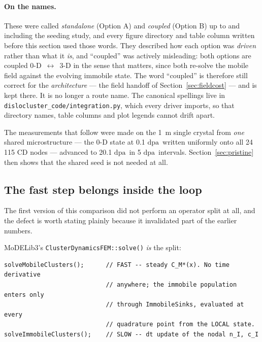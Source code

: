 \documentclass[11pt,a4paper]{article}
\newcommand{\code}[1]{\texttt{\small #1}}
\newcommand{\dpa}{\ensuremath{\mathrm{dpa}}}
\begin{document}
\paragraph{On the names.} These were called \emph{standalone} (Option A) and
\emph{coupled} (Option B) up to and including the seeding study, and every
figure directory and table column written before this section used those words.
They described how each option was \emph{driven} rather than what it \emph{is},
and ``coupled'' was actively misleading: both options are coupled
0-D~$\leftrightarrow$~3-D in the sense that matters, since both re-solve the
mobile field against the evolving immobile state. The word ``coupled'' is
therefore still correct for the \emph{architecture} --- the field handoff of
Section~\ref{sec:fieldcost} --- and is kept there. It is no longer a route name.
The canonical spellings live in \code{dislocluster\_code/integration.py}, which
every driver imports, so that directory names, table columns and plot legends
cannot drift apart.

The measurements that follow were made on the 1~\textmu m single crystal from
\emph{one} shared microstructure --- the 0-D state at 0.1 \dpa\ written
uniformly onto all 24\,115 CD nodes --- advanced to 20.1 \dpa\ in 5 \dpa\
intervals. Section~\ref{sec:pristine} then shows that the shared seed is not
needed at all.

\subsection{The fast step belongs inside the loop}
\label{sec:fastinloop}

The first version of this comparison did not perform an operator split at all,
and the defect is worth stating plainly because it invalidated part of the
earlier numbers.

MoDELib3's \code{ClusterDynamicsFEM::solve()} \emph{is} the split:

\begin{center}
\begin{minipage}{0.88\textwidth}
\begin{verbatim}
solveMobileClusters();      // FAST -- steady C_M*(x). No time derivative
                            // anywhere; the immobile population enters only
                            // through ImmobileSinks, evaluated at every
                            // quadrature point from the LOCAL state.
solveImmobileClusters();    // SLOW -- dt update of the nodal n_I, c_I
\end{verbatim}
\end{minipage}
\end{center}
\end{document}
